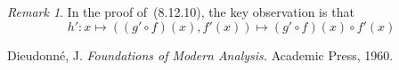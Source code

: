 \documentclass[letterpaper,12pt]{article}
\newcommand{\after}{\circ}
\theoremstyle{plain}
\theoremstyle{definition}
\theoremstyle{remark}
\newtheorem*{rmk}{Remark}
\begin{document}
\begin{rmk}
In the proof of~(8.12.10), the key observation is that
\[h':x\mapsto ((g'\after f)(x),f'(x))\mapsto (g'\after f)(x)\after f'(x)\]
\end{rmk}

\begin{thebibliography}{0}
 Dieudonn\'e, J. \textit{Foundations of Modern Analysis.} Academic Press, 1960.
\end{thebibliography}
\end{document}
